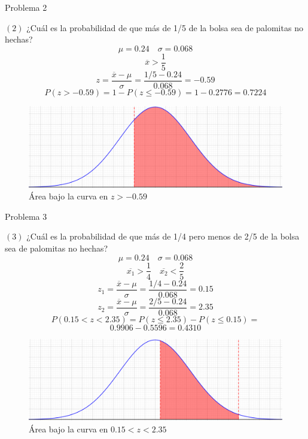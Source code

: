 \documentclass[11pt]{beamer}
\begin{document}
		\begin{frame}{Problema 2}
			\begin{block}{$ \left( 2 \right) $ ¿Cuál es la probabilidad de que más de 1/5 de la bolsa sea de palomitas no hechas?}
				$$ \mu = 0.24 \quad \sigma = 0.068 $$
				$$ \overline{x} > \frac{1}{5} $$
				$$ z = \frac{\overline{x} - \mu}{\sigma} = \frac{1/5 - 0.24}{0.068} = -0.59 $$
				$$ P(z > -0.59) = 1 - P(z \leq -0.59) = 1 - 0.2776 = 0.7224 $$
			\end{block}
		\end{frame}

		\begin{frame}
			\begin{figure}[H]
				\centering
				\includegraphics[width=\linewidth]{Imagen2.png}
				\caption{Área bajo la curva en $ z > -0.59 $}
			\end{figure}
		\end{frame}

		\begin{frame}{Problema 3}
			\begin{block}{$ \left( 3 \right) $ ¿Cuál es la probabilidad de que más de 1/4 pero menos de 2/5 de la bolsa sea de palomitas no hechas?}
				$$ \mu = 0.24 \quad \sigma = 0.068 $$
				$$ \overline{x_1} > \frac{1}{4} \quad \overline{x_2} < \frac{2}{5}  $$
				$$ z_1 = \frac{\overline{x} - \mu}{\sigma} = \frac{1/4 - 0.24}{0.068} = 0.15 $$
				$$ z_2 = \frac{\overline{x} - \mu}{\sigma} = \frac{2/5 - 0.24}{0.068} = 2.35 $$
				$$ P(0.15 < z < 2.35) = P(z \leq 2.35) - P(z \leq 0.15) = $$
				$$ 0.9906 - 0.5596 = 0.4310 $$
			\end{block}
		\end{frame}

		\begin{frame}
			\begin{figure}[H]
				\centering
				\includegraphics[width=\linewidth]{Imagen3.png}
				\caption{Área bajo la curva en $0.15 < z < 2.35 $}
			\end{figure}
		\end{frame}
\end{document}

